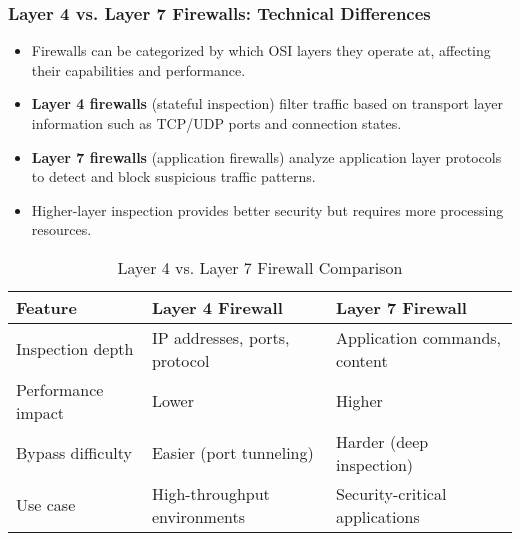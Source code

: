 \documentclass{beamer}
\begin{document}
\begin{frame}
    \frametitle{Layer 4 vs. Layer 7 Firewalls: Technical Differences}
    \begin{itemize}
        \item Firewalls can be categorized by which OSI layers they operate at, affecting their capabilities and performance.
        \item \textbf{Layer 4 firewalls} (stateful inspection) filter traffic based on transport layer information such as TCP/UDP ports and connection states.
        \item \textbf{Layer 7 firewalls} (application firewalls) analyze application layer protocols to detect and block suspicious traffic patterns.
        \item Higher-layer inspection provides better security but requires more processing resources.
    \end{itemize}
    
    \scriptsize
    \begin{table}
        \centering
        \begin{tabular}{|l|p{}|p{}|}
            \hline
            \textbf{Feature} & \textbf{Layer 4 Firewall} & \textbf{Layer 7 Firewall} \\
            \hline
            Inspection depth & IP addresses, ports, protocol & Application commands, content \\
            \hline
            Performance impact & Lower & Higher \\
            \hline
            Bypass difficulty & Easier (port tunneling) & Harder (deep inspection) \\
            \hline
            Use case & High-throughput environments & Security-critical applications \\
            \hline
        \end{tabular}
        \caption{Layer 4 vs. Layer 7 Firewall Comparison}
    \end{table}
\end{frame}
\end{document}
